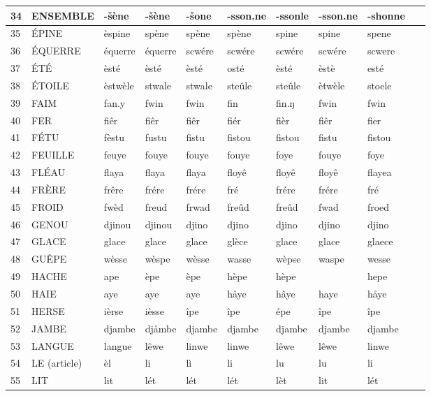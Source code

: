 \documentclass[french]{article}
\begin{document}
\begin{landscape}
\begin{longtable}{|l|l|l|l|l|l|l|l||l|l|}
	34 & ENSEMBLE & -šène & -šène & -šone & -sson.ne & -ssonle & -sson.ne & -shonne & ~ \\ \hline
	35 & ÉPINE & èspine & spène & spène & spène & spine & spine & spene & ~ \\ \hline
	36 & ÉQUERRE & équerre & équerre & scwére & scwére & scwére & scwére & scwere & ~ \\ \hline
	37 & ÉTÉ & èsté & èsté & èsté & osté & èsté & èstè & esté & ~ \\ \hline
	38 & ÉTOILE & èstwèle & stwale & stwale & steûle & steûle & ètwèle & stoele & ~ \\ \hline
	39 & FAIM & fan.y & fwin & fwin & fin & fin.ŋ & fwin & fwin & ~ \\ \hline
	40 & FER & fiêr & fiêr & fiêr & fiér & fièr & fiêr & fier & ~ \\ \hline
	41 & FÉTU & fèstu & fustu & fistu & fistou & fistou & fistu & fistou & ~ \\ \hline
	42 & FEUILLE & feuye & fouye & fouye & fouye & foye & fouye & foye & ~ \\ \hline
	43 & FLÉAU & flaya & flaya & flaya & floyê & floyê & floyê & flayea & ~ \\ \hline
	44 & FRÈRE & frêre & frére & frére & fré & frére & frére & fré & ~ \\ \hline
	45 & FROID & fwèd & freud & frwad & freûd & freûd & fwad & froed & ~ \\ \hline
	46 & GENOU & djinou & djinou & djino & djino & djino & djino & djino & ~ \\ \hline
	47 & GLACE & glace & glace & glace & glèce & glace & glace & glaece & ~ \\ \hline
	48 & GUÊPE & wèsse & wèspe & wèsse & wasse & wèpse & waspe & wesse & ~ \\ \hline
	49 & HACHE & ape & èpe & èpe & hèpe & hèpe & ~ & hepe & ~ \\ \hline
	50 & HAIE & aye & aye & aye & håye & hâye & haye & håye & ~ \\ \hline
	51 & HERSE & ièrse & ièsse & îpe & îpe & épe & îpe & îpe & ~ \\ \hline
	52 & JAMBE & djambe & djåmbe & djambe & djambe & djambe & djambe & djambe & ~ \\ \hline
	53 & LANGUE & langue & lêwe & linwe & linwe & lêwe & lêwe & linwe & ~ \\ \hline
	54 & LE (article) & èl & li & lì & li & lu & lu & li & ~ \\ \hline
	55 & LIT & lit & lét & lét & lét & lèt & lit & lét & ~ \\ \hline

\end{longtable}
\end{landscape}
\end{document}
